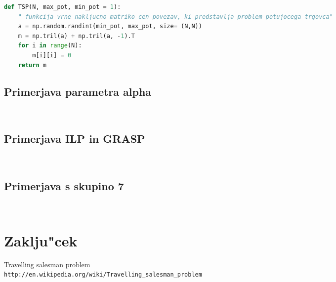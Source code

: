 \documentclass[12pt,a4paper]{amsart}
\theoremstyle{definition} %
\theoremstyle{plain} %
\begin{document}
\begin{lstlisting}[language=Python]
def TSP(N, max_pot, min_pot = 1):
    " funkcija vrne nakljucno matriko cen povezav, ki predstavlja problem potujocega trgovca"
    a = np.random.randint(min_pot, max_pot, size= (N,N))
    m = np.tril(a) + np.tril(a, -1).T
    for i in range(N):
        m[i][i] = 0
    return m
\end{lstlisting}

\subsection{Primerjava parametra alpha} ~\\
\subsection{Primerjava ILP in GRASP} ~\\
\subsection{Primerjava s skupino 7} ~\\
\section{Zaklju"cek}


\pagebreak
\begin{thebibliography}{99}

Travelling salesman problem
\\\texttt{http://en.wikipedia.org/wiki/Travelling\_salesman\_problem}


\end{thebibliography}
\end{document}
